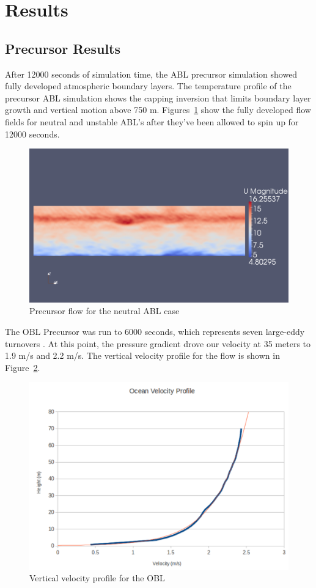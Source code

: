 \section{Results}

\subsection{Precursor Results}
After 12000 seconds of simulation time, the ABL precursor simulation showed fully developed atmospheric boundary layers.  The temperature profile of the precursor ABL simulation shows the capping inversion that limits boundary layer growth and vertical motion above 750 m.  Figures~\ref{fig:neutralABLPrecursorVelocity}  show the fully developed flow fields for neutral and unstable ABL's after they've been allowed to spin up for 12000 seconds.  

\begin{figure}
\centering
\includegraphics[width=\textwidth]{images/neutralABLPrecursorVelocity}
\caption{Precursor flow for the neutral ABL case}
\label{fig:neutralABLPrecursorVelocity}
\end{figure}

The OBL Precursor was run to 6000 seconds, which represents seven large-eddy turnovers \cite{churchfield_large-eddy_2012}. At this point, the pressure gradient drove our velocity at 35 meters to 1.9 m/s and 2.2 m/s. The vertical velocity profile for the flow is shown in Figure~\ref{fig:ocean-vertical-speed-profile}.

\begin{figure}
\centering
\includegraphics[width=.6\textwidth]{images/ocean-vertical-speed-profile}
\caption{Vertical velocity profile for the OBL}
\label{fig:ocean-vertical-speed-profile}
\end{figure}

